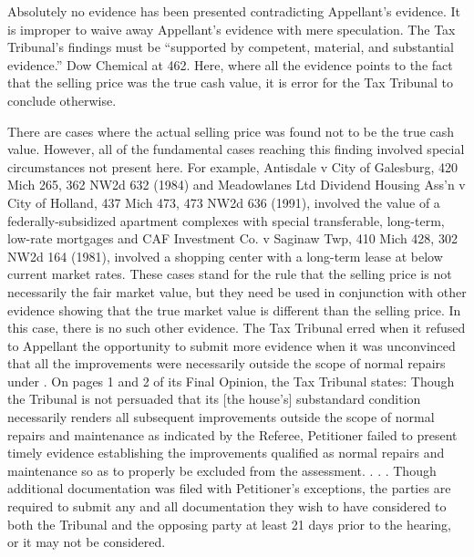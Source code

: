 \documentclass[12pt,\documentclassflag]{michiganCourtOfAppealsBrief}
\begin{document}
Absolutely no evidence has been presented contradicting Appellant's evidence. It is improper to waive away Appellant's evidence with mere speculation. The Tax Tribunal's findings must be ``supported by competent, material, and substantial evidence.'' Dow Chemical at 462. Here, where all the evidence points to the fact that the selling price was the true cash value, it is error for the Tax Tribunal to conclude otherwise.

There are cases where the actual selling price was found not to be the true cash value. However, all of the fundamental cases reaching this finding involved special circumstances not present here. For example, Antisdale v City of Galesburg, 420 Mich 265, 362 NW2d 632 (1984) and Meadowlanes Ltd Dividend Housing Ass'n v City of Holland, 437 Mich 473, 473 NW2d 636 (1991), involved the value of a federally-subsidized apartment complexes with special transferable, long-term, low-rate mortgages and CAF Investment Co. v Saginaw Twp, 410 Mich 428, 302 NW2d 164 (1981), involved a shopping center with a long-term lease at below current market rates. These cases stand for the rule that the selling price is not necessarily the fair market value, but they need be used in conjunction with other evidence showing that the true market value is different than the selling price. In this case, there is no such other evidence.
The Tax Tribunal erred when it refused to Appellant the opportunity to submit more evidence when it was unconvinced that all the improvements were necessarily outside the scope of normal repairs under .
On pages 1 and 2 of its Final Opinion, the Tax Tribunal states: 
Though the Tribunal is not persuaded that its [the house's] substandard condition necessarily renders all subsequent improvements outside the scope of normal repairs and maintenance as indicated by the Referee, Petitioner failed to present timely evidence establishing the improvements qualified as normal repairs and maintenance so as to properly be excluded from the assessment. . . . Though additional documentation was filed with Petitioner's exceptions, the parties are required to submit any and all documentation they wish to have considered to both the Tribunal and the opposing party at least 21 days prior to the hearing, or it may not be considered.
 
\end{document}
